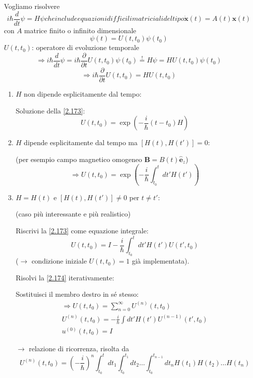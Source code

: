 \documentclass[a4paper,11pt]{report}
\newcommand{\vect}[1]{\boldsymbol{#1}}
\newcommand{\x}{\boldsymbol{x}}
\begin{document}
Vogliamo risolvere
\begin{subequations}
\begin{equation}
i\hbar \frac{d}{dt}\psi = H \psi 
\label{2.171a}
\end{equation}
che include equazioni difficili matriciali del tipo 
\begin{equation}
\dot{\x}(t)=A(t)\x(t)
\label{2.171b}
\end{equation}
\end{subequations}
con $A$ matrice finito o infinito dimensionale
\begin{equation}
\psi(t)=U(t,t_0)\psi(t_0)
\label{2.172}
\end{equation}
$U(t,t_0)$: operatore di evoluzione temporale
\[
\Rightarrow i\hbar \frac{d}{dt}\psi = i\hbar \frac{\partial}{\partial t}U(t,t_0)\psi(t_0)\overset{!}{=}H\psi = HU(t,t_0)\psi(t_0)
\]
\begin{equation}
\Rightarrow i\hbar \frac{\partial }{\partial t}U(t,t_0)=HU(t,t_0) 
\label{2.173}
\end{equation}
\begin{enumerate}[label=(\roman*)]
\item $H$ non dipende esplicitamente dal tempo:

Soluzione della \eqref{2.173}:
\[
U(t,t_0)=\exp \left(-\frac{i}{\hbar}(t-t_0)H\right)
\]
\item $H$ dipende esplicitamente dal tempo ma $[H(t),H(t')]=0$:

(per esempio campo magnetico omogeneo $\vect{B}=B(t)\hat{\vect{e}}_z$)
\[
\Rightarrow U(t,t_0)=\exp \left(-\frac{i}{\hbar}\int_{t_0}^t dt' H(t')\right)
\]
\item $H=H(t)$ e $[H(t),H(t')]\neq 0$ per $t\neq t'$:

(caso pi\`u interessante e pi\`u realistico)

Riscrivi la \eqref{2.173} come equazione integrale:
\begin{equation}
U(t,t_0) = I - \frac{i}{\hbar}\int_{t_0}^t dt' H(t')U(t',t_0)
\label{2.174}
\end{equation}
($\rightarrow$ condizione iniziale $U(t,t_0)=1$ già implementata).

Risolvi la \eqref{2.174} iterativamente: 

Sostituisci il membro destro in s\'e stesso:
\begin{equation}
\begin{gathered}
\Rightarrow U(t,t_0)=\sum_{n=0}^\infty U^{(n)}(t,t_0)\\
U^{(n)}(t,t_0)=-\frac{i}{\hbar}\int dt' H(t') U^{(n-1)}(t',t_0)\\
u^{(0)}(t,t_0)=I
\end{gathered} 
\label{2.175}
\end{equation}

$\rightarrow$ relazione di ricorrenza, risolta da
\begin{equation}
U^{(n)}(t,t_0)=\left(-\frac{i}{\hbar}\right)^n\int_{t_0}^tdt_1 \int_{t_0}^{t_1}dt_2 \ldots \int_{t_0}^{t_{n-1}}dt_n H(t_1)H(t_2) \ldots H(t_n)
\label{2.176}
\end{equation}
\end{enumerate}
\end{document}
